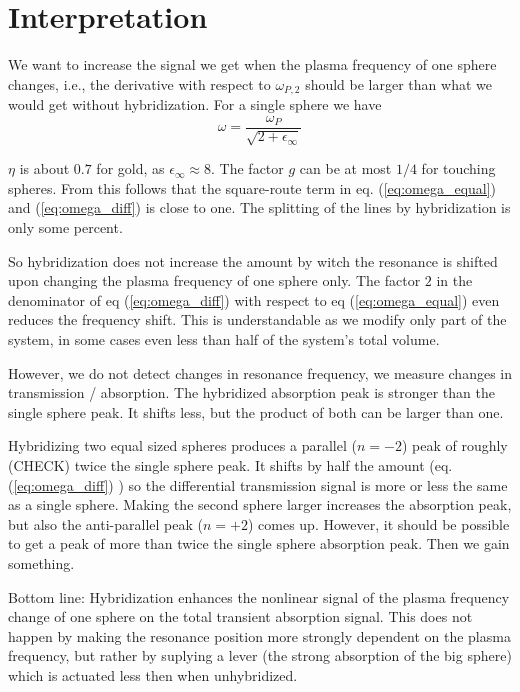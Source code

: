 \section{Interpretation}


We want to increase the  signal we get when the plasma frequency of one sphere
changes, i.e., the derivative with respect to $\omega_{P,2}$ should be larger
than what we would get without hybridization. For a single sphere we have
\begin{equation}
 \omega = \frac{\omega_P}{\sqrt{2 + \epsilon_{\infty}} } 
\end{equation}

$\eta$ is about $0.7$ for gold, as $\epsilon_{\infty} \approx 8$. The factor $g$
can be at most $1/4$ for touching spheres. From this follows that the
square-route term in eq. (\ref{eq:omega_equal}) and (\ref{eq:omega_diff}) is
close to one. The splitting of the lines by
hybridization is only some percent.


So hybridization does not increase the amount by witch the resonance is shifted
upon changing the plasma frequency of one sphere only. The factor $2$ in the
denominator of eq (\ref{eq:omega_diff})  with respect to eq
(\ref{eq:omega_equal}) even reduces the frequency shift. This is understandable
as we modify only part of the system,  in some cases even less than half of the
system's total volume.

However, we do not detect changes in resonance frequency, we measure changes in
transmission / absorption. The hybridized absorption peak is stronger than the
single sphere peak. It shifts less, but the product of both can be larger than
one.

Hybridizing two equal sized spheres produces a parallel ($n=-2$) peak of roughly
(CHECK) twice the  single sphere peak. It shifts by half the amount (eq.
(\ref{eq:omega_diff}) ) so the differential transmission signal is more or less
the same as a single sphere. Making the second sphere larger increases the
absorption peak, but also the anti-parallel peak ($n=+2$) comes up. However, it
should be possible to get a peak of more than twice the single sphere absorption
peak. Then we gain something.

Bottom line: Hybridization enhances the nonlinear signal of the plasma frequency
change of one sphere on the total transient absorption signal. This does not
happen by making the resonance position more strongly dependent on the plasma
frequency, but rather by suplying a lever (the strong absorption of the big
sphere) which is actuated less then when unhybridized.
 
